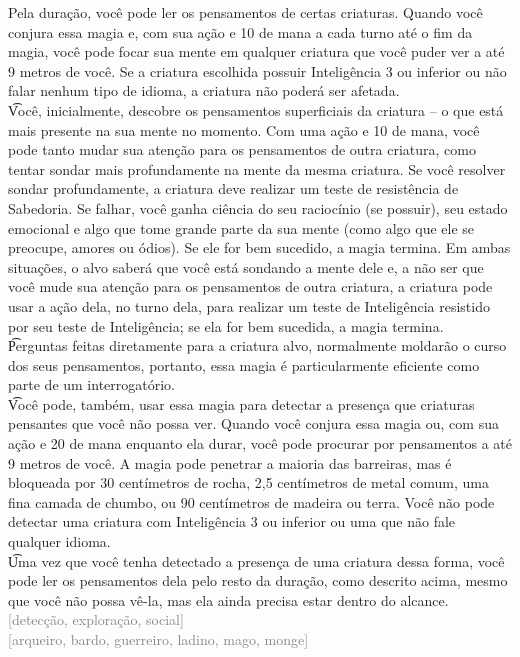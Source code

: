 \documentclass{RPG_Adventure}[2021/10/20]
\begin{document}
{\normalsize Pela duração, você pode ler os pensamentos de certas criaturas. Quando você conjura essa magia e, com sua ação e 10 de mana a cada turno até o fim da magia, você pode focar sua mente em qualquer criatura que você puder ver a até 9 metros de você. Se a criatura escolhida possuir Inteligência 3 ou inferior ou não falar nenhum tipo de idioma, a criatura não poderá ser afetada.\\\t Você, inicialmente, descobre os pensamentos superficiais da criatura – o que está mais presente na sua mente no momento. Com uma ação e 10 de mana, você pode tanto mudar sua atenção para os pensamentos de outra criatura, como tentar sondar mais profundamente na mente da mesma criatura. Se você resolver sondar profundamente, a criatura deve realizar um teste de resistência de Sabedoria. Se falhar, você ganha ciência do seu raciocínio (se possuir), seu estado emocional e algo que tome grande parte da sua mente (como algo que ele se preocupe, amores ou ódios). Se ele for bem sucedido, a magia termina. Em ambas situações, o alvo saberá que você está sondando a mente dele e, a não ser que você mude sua atenção para os pensamentos de outra criatura, a criatura pode usar a ação dela, no turno dela, para realizar um teste de Inteligência resistido por seu teste de Inteligência; se ela for bem sucedida, a magia termina.\\\t Perguntas feitas diretamente para a criatura alvo, normalmente moldarão o curso dos seus pensamentos, portanto, essa magia é particularmente eficiente como parte de um interrogatório.\\\t Você pode, também, usar essa magia para detectar a presença que criaturas pensantes que você não possa ver.  Quando você conjura essa magia ou, com sua ação e 20 de mana enquanto ela durar, você pode procurar por pensamentos a até 9 metros de você. A magia pode penetrar a maioria das barreiras, mas é bloqueada por 30 centímetros de rocha, 2,5 centímetros de metal comum, uma fina camada de chumbo, ou 90 centímetros de madeira ou terra. Você não pode detectar uma criatura com Inteligência 3 ou inferior ou uma que não fale qualquer idioma.\\\t Uma vez que você tenha detectado a presença de uma criatura dessa forma, você pode ler os pensamentos dela pelo resto da duração, como descrito acima, mesmo que você não possa vê-la, mas ela ainda precisa estar dentro do alcance.\\}
{\scriptsize \textcolor{gray}{[detecção, exploração, social]\\}}
{\scriptsize \textcolor{gray}{[arqueiro, bardo, guerreiro, ladino, mago, monge]\\}}
\end{document}
